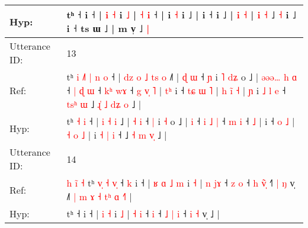 \documentclass[10pt]{article}
\DeclareRobustCommand{\hl}[1]{{\textcolor{red}{#1}}}
\begin{document}
\begin{longtable}{ll}
 \\
Hyp: & tʰ\hl{}\hl{}\hl{}\hl{}\hl{}\hl{}\hl{}\hl{}\hl{} ˧\hl{}\hl{} i ˧\hl{} |\hl{}\hl{}\hl{}\hl{} \hl{i} \hl{˧} i \hl{˩} | \hl{˧} \hl{}\hl{i} ˧ |\hl{}\hl{}\hl{}\hl{}\hl{}\hl{}\hl{}\hl{}\hl{} i\hl{}\hl{}\hl{}\hl{}\hl{}\hl{}\hl{}\hl{} \hl{˧} i ˩\hl{} |\hl{}\hl{}\hl{}\hl{}\hl{}\hl{}\hl{}\hl{} i ˧\hl{}\hl{}\hl{}\hl{}\hl{} i ˩\hl{} |\hl{}\hl{}\hl{}\hl{}\hl{}\hl{}\hl{}\hl{}\hl{} \hl{i} \hl{}\hl{˧} | \hl{}\hl{i} \hl{˧} ˩ \hl{˧} i ˩\hl{}\hl{}\hl{}\hl{}\hl{} i ˧ ts ɯ ˩ | m v̩ ˩\hl{ }\hl{|}
 \\
\midrule
Utterance ID: & 13 \\
Ref: & tʰ\hl{ }\hl{i}\hl{ }\hl{˩}\hl{˥}\hl{ }\hl{|} \hl{n} \hl{o} ˧ |\hl{ }\hl{d}\hl{z}\hl{ }\hl{o} \hl{˩} \hl{t}\hl{s} \hl{o} ˩\hl{˥} | \hl{ɖ} \hl{ɯ} ˧ \hl{ɲ} i\hl{ }\hl{˥} \hl{d}\hl{ʑ} o ˩ |\hl{ }\hl{ə}\hl{ə}\hl{ə}\hl{…}\hl{ }\hl{h} \hl{ɑ} ˧ \hl{|} \hl{ɖ} \hl{ɯ} ˧ \hl{k}\hl{ʰ} \hl{w}\hl{ɤ} ˧\hl{ }\hl{g}\hl{ }\hl{v}\hl{̩} \hl{˥} |\hl{ }\hl{t}\hl{ʰ} i ˧\hl{ }\hl{t}\hl{ɕ} \hl{ɯ} \hl{˥} | \hl{h} \hl{i}\hl{̃} \hl{˧} |\hl{ }\hl{ɲ} i \hl{˩} \hl{l} \hl{e} ˧\hl{ }\hl{t}\hl{s}\hl{ʰ}\hl{ }\hl{ɯ} ˩ \hl{ɻ}\hl{̍} \hl{˩} \hl{d}\hl{ʑ}\hl{ }\hl{o} ˩ |
 \\
Hyp: & tʰ\hl{}\hl{}\hl{}\hl{}\hl{}\hl{}\hl{} \hl{˧} \hl{i} ˧ |\hl{}\hl{}\hl{}\hl{}\hl{} \hl{i} \hl{}\hl{˧} \hl{i} ˩\hl{} | \hl{˧} \hl{i} ˧ \hl{|} i\hl{}\hl{} \hl{}\hl{˧} o ˩ |\hl{}\hl{}\hl{}\hl{}\hl{}\hl{}\hl{} \hl{i} ˧ \hl{i} \hl{˩} \hl{|} ˧ \hl{}\hl{m} \hl{}\hl{i} ˧\hl{}\hl{}\hl{}\hl{}\hl{} \hl{˩} |\hl{}\hl{}\hl{} i ˧\hl{}\hl{}\hl{} \hl{o} \hl{˩} | \hl{˧} \hl{}\hl{o} \hl{˩} |\hl{}\hl{} i \hl{˧} \hl{|} \hl{i} ˧\hl{}\hl{}\hl{}\hl{}\hl{}\hl{} ˩ \hl{}\hl{˧} \hl{m} \hl{}\hl{}\hl{v}\hl{̩} ˩ |
 \\
\midrule
Utterance ID: & 14 \\
Ref: & \hl{h}\hl{ }\hl{i}\hl{̃}\hl{ }\hl{˧}\hl{ }tʰ\hl{ }\hl{v}\hl{̩}\hl{ }\hl{˧}\hl{ }\hl{v}\hl{̩} ˧\hl{ }\hl{k} i ˧ |\hl{ }\hl{ʁ}\hl{ }\hl{ɑ} \hl{˩} \hl{m} i \hl{˧} | \hl{n} \hl{j}\hl{ɤ} ˧\hl{ }\hl{z} \hl{o} ˧ \hl{h} \hl{v}\hl{̃}\hl{̩} ˧\hl{˥} \hl{|} \hl{ŋ} v̩ ˩\hl{˥}\hl{ }\hl{|}\hl{ }\hl{m}\hl{ }\hl{ɤ}\hl{ }\hl{˧}\hl{ }\hl{t}\hl{ʰ}\hl{ }\hl{ɑ}\hl{ }\hl{˧}\hl{˥} |
 \\
Hyp: & \hl{}\hl{}\hl{}\hl{}\hl{}\hl{}\hl{}tʰ\hl{}\hl{}\hl{}\hl{}\hl{}\hl{}\hl{}\hl{} ˧\hl{}\hl{} i ˧ |\hl{}\hl{}\hl{}\hl{} \hl{i} \hl{˧} i \hl{˩} | \hl{˧} \hl{}\hl{i} ˧\hl{}\hl{} \hl{i} ˧ \hl{˩} \hl{|}\hl{ }\hl{i} ˧\hl{} \hl{i} \hl{˧} v̩ ˩\hl{}\hl{}\hl{}\hl{}\hl{}\hl{}\hl{}\hl{}\hl{}\hl{}\hl{}\hl{}\hl{}\hl{}\hl{}\hl{}\hl{} |
 \\

\end{longtable}
\end{document}
